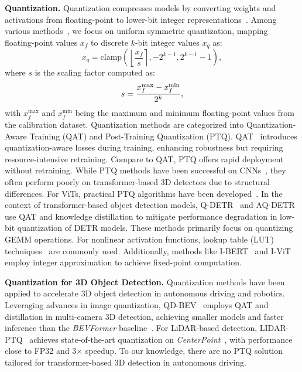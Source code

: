 \textbf{Quantization.}
Quantization compresses models by converting weights and activations from floating-point to lower-bit integer representations~\cite{PACT_arxiv2018,LQNets_eccv2018,PTQ_4bit_rapid_deployment_nips2019,Low_bit_quant_iccvw2019}. Among various methods~\cite{shao2023omniquant,wei2022outlier,liu2024spinquant,ashkboos2024slicegpt,ashkboos2024quarot,xiao2023smoothquant}, we focus on uniform symmetric quantization, mapping floating-point values $x_f$ to discrete $k$-bit integer values $x_q$ as:
\begin{equation}\label{e:eq1}
x_q = \text{clamp}\left( \left\lfloor \frac{x_f}{s} \right\rceil, -2^{k-1}, 2^{k-1}-1 \right),
\end{equation}
where $s$ is the scaling factor computed as:
\begin{equation}\label{e:eq2}
\vspace{-3mm}
s = \frac{x_f^{\text{max}} - x_f^{\text{min}}}{2^k},
\end{equation}
with $x_f^{\text{max}}$ and $x_f^{\text{min}}$ being the maximum and minimum floating-point values from the calibration dataset. Quantization methods are categorized into Quantization-Aware Training (QAT) and Post-Training Quantization (PTQ). QAT~\cite{esser2019learned,bhalgat2020lsq+} introduces quantization-aware losses during training, enhancing robustness but requiring resource-intensive retraining. Compare to QAT, PTQ offers rapid deployment without retraining. While PTQ methods have been successful on CNNs~\cite{nagel2019data,nagel2020up,li2021brecq}, they often perform poorly on transformer-based 3D detectors due to structural differences. For ViTs, practical PTQ algorithms have been developed~\cite{yuan2022ptq4vit,lin2021fq,tai2023tsptq,li2023repq}. In the context of transformer-based object detection models, Q-DETR~\cite{xu2023q} and AQ-DETR~\cite{wang2024aq} use QAT and knowledge distillation to mitigate performance degradation in low-bit quantization of DETR models. These methods primarily focus on quantizing GEMM operations. For nonlinear activation functions, lookup table (LUT) techniques~\cite{wang2018look} are commonly used. Additionally, methods like I-BERT~\cite{kim2021bert} and I-ViT~\cite{li2023vit} employ integer approximation to achieve fixed-point computation.

\textbf{Quantization for 3D Object Detection.}
Quantization methods have been applied to accelerate 3D object detection in autonomous driving and robotics. Leveraging advances in image quantization, QD-BEV~\cite{zhang2023qd} employs QAT and distillation in multi-camera 3D detection, achieving smaller models and faster inference than the \textit{BEVFormer} baseline~\cite{li2022bevformer}. For LiDAR-based detection, LIDAR-PTQ~\cite{zhou2024lidar} achieves state-of-the-art quantization on \textit{CenterPoint}~\cite{centerpoint}, with performance close to FP32 and 3$\times$ speedup. To our knowledge, there are no PTQ solution tailored for transformer-based 3D detection in autonomous driving.

